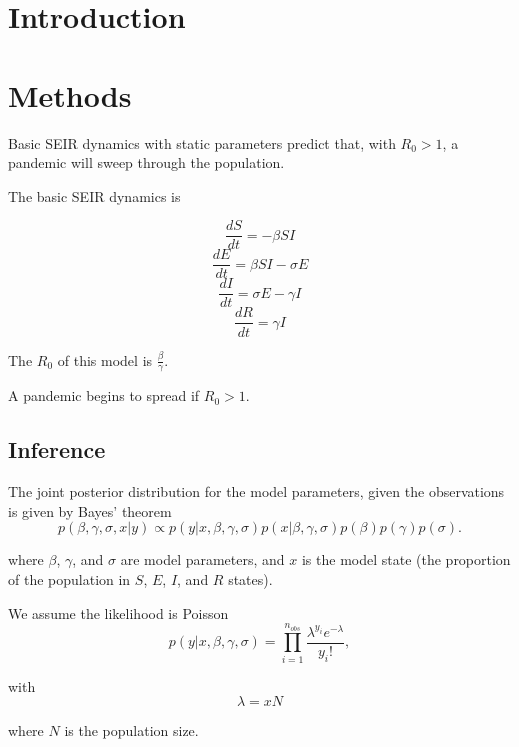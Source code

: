 \documentclass[11pt]{article}
\begin{document}
\section*{Introduction}


\section*{Methods}
Basic SEIR dynamics with static parameters predict that, with $R_0>1$, a pandemic will sweep through the population. 

The basic SEIR dynamics is

\[ \frac{dS}{dt} = -\beta S I   \]
\[ \frac{dE}{dt} = \beta S I - \sigma E \]
\[ \frac{dI}{dt} = \sigma E - \gamma I \]
\[ \frac{dR}{dt} = \gamma I \]

The $R_0$ of this model is $\frac{\beta}{\gamma}$.

A pandemic begins to spread if $R_0>1$.

\subsection*{Inference}
The joint posterior distribution for the model parameters, given the observations is given by Bayes' theorem
\[p(\beta,\gamma,\sigma,x|y) \propto p(y|x,\beta,\gamma,\sigma) p(x|\beta,\gamma,\sigma)p(\beta)p(\gamma)p(\sigma). \]

where $\beta$, $\gamma$, and $\sigma$ are model parameters, and $x$ is the model state (the proportion of the population in $S$, $E$, $I$, and $R$ states). 

We assume the likelihood is Poisson
\[ p(y|x,\beta,\gamma,\sigma) = \prod_{i=1}^{n_{obs}} \frac{\lambda^{y_i}e^{-\lambda}}{y_i!},\]

with
\[ \lambda = xN \]

where $N$ is the population size. 
\end{document}

